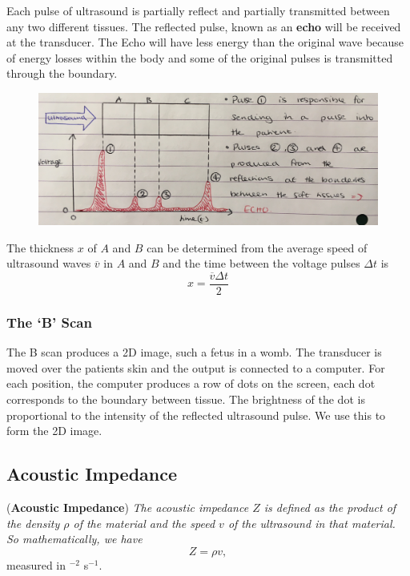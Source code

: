 Each pulse of ultrasound is partially reflect and partially transmitted between any two different tissues. The reflected pulse, known as an \textbf{echo} will be received at the transducer. The Echo will have less energy than the original wave because of energy losses within the body and some of the original pulses is transmitted through the boundary. 

\begin{figure}[h!]
    \centering
    \includegraphics[scale=0.1]{notes/images/Ultrasound-1.JPG}
\end{figure}
\FloatBarrier

The thickness $x$ of $A$ and $B$ can be determined from the average speed of ultrasound waves $\overline{v}$ in $A$ and $B$ and the time between the voltage pulses $\Delta t$ is
\begin{equation}
    x = \frac{\overline{v}\Delta t}{2}
\end{equation}

\subsubsection{The `B' Scan}

The B scan produces a 2D image, such a fetus in a womb. The transducer is moved over the patients skin and the output is connected to a computer. For each position, the computer produces a row of dots on the screen, each dot corresponds to the boundary between tissue. The brightness of the dot is proportional to the intensity of the reflected ultrasound pulse. We use this to form the 2D image.

\subsection{Acoustic Impedance}

\begin{definition}{(\textbf{Acoustic Impedance})}
\textit{The acoustic impedance $Z$ is defined as the product of the density $\rho$ of the material and the speed $v$ of the ultrasound in that material. So mathematically, we have}
\begin{equation}
    Z = \rho v,
\end{equation}
measured in $^{-2}$ s$^{-1}$.
\end{definition}

